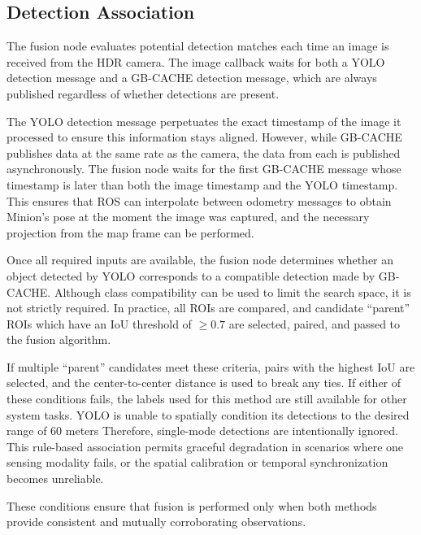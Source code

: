 \documentclass{erauthesis}
\begin{document}
\subsection{Detection Association}
The fusion node evaluates potential detection matches each time an image is received from the HDR camera. The image callback waits for both a YOLO detection message and a GB-CACHE detection message, which are always published regardless of whether detections are present.

The YOLO detection message perpetuates the exact timestamp of the image it processed to ensure this information stays aligned.
However, while GB-CACHE publishes data at the same rate as the camera, the data from each is published asynchronously. The fusion node waits for the first GB-CACHE message whose timestamp is later than both the image timestamp and the YOLO timestamp.
This ensures that ROS can interpolate between odometry messages to obtain Minion's pose at the moment the image was captured, and the necessary projection from the map frame can be performed.

Once all required inputs are available, the fusion node determines whether an object detected by YOLO corresponds to a compatible detection made by GB-CACHE. Although class compatibility can be used to limit the search space, it is not strictly required.
In practice, all ROIs are compared, and candidate ``parent'' ROIs which have an IoU threshold of $\geq 0.7$ are selected, paired, and passed to the fusion algorithm. 

If multiple ``parent'' candidates meet these criteria, pairs with the highest IoU are selected, and the center-to-center distance is used to break any ties.
If either of these conditions fails, the labels used for this method are still available for other system tasks.
YOLO is unable to spatially condition its detections to the desired range of 60 meters
Therefore, single-mode detections are intentionally ignored.
This rule-based association permits graceful degradation in scenarios where one sensing modality fails, or the spatial calibration or temporal synchronization becomes unreliable.

These conditions ensure that fusion is performed only when both methods provide consistent and mutually corroborating observations.
\end{document}
